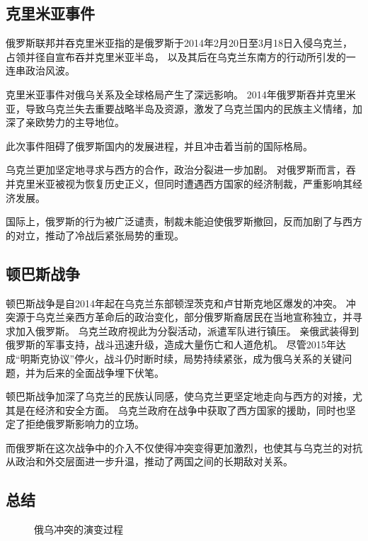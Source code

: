 \subsection{克里米亚事件}
俄罗斯联邦并吞克里米亚指的是俄罗斯于2014年2月20日至3月18日入侵乌克兰，
占领并径自宣布吞并克里米亚半岛，
以及其后在乌克兰东南方的行动所引发的一连串政治风波。\cite{noauthor__2024}

克里米亚事件对俄乌关系及全球格局产生了深远影响。
2014年俄罗斯吞并克里米亚，导致乌克兰失去重要战略半岛及资源，激发了乌克兰国内的民族主义情绪，加深了亲欧势力的主导地位。

此次事件阻碍了俄罗斯国内的发展进程，并且冲击着当前的国际格局。\cite{__2023-2}

乌克兰更加坚定地寻求与西方的合作，政治分裂进一步加剧。
对俄罗斯而言，吞并克里米亚被视为恢复历史正义，但同时遭遇西方国家的经济制裁，严重影响其经济发展。

国际上，俄罗斯的行为被广泛谴责，制裁未能迫使俄罗斯撤回，反而加剧了与西方的对立，推动了冷战后紧张局势的重现。
\subsection{顿巴斯战争}
顿巴斯战争是自2014年起在乌克兰东部顿涅茨克和卢甘斯克地区爆发的冲突。
冲突源于乌克兰亲西方革命后的政治变化，部分俄罗斯裔居民在当地宣称独立，并寻求加入俄罗斯。
乌克兰政府视此为分裂活动，派遣军队进行镇压。
亲俄武装得到俄罗斯的军事支持，战斗迅速升级，造成大量伤亡和人道危机。
尽管2015年达成“明斯克协议”停火，战斗仍时断时续，局势持续紧张，成为俄乌关系的关键问题，并为后来的全面战争埋下伏笔。

顿巴斯战争加深了乌克兰的民族认同感，使乌克兰更坚定地走向与西方的对接，尤其是在经济和安全方面。
乌克兰政府在战争中获取了西方国家的援助，同时也坚定了拒绝俄罗斯影响力的立场。

而俄罗斯在这次战争中的介入不仅使得冲突变得更加激烈，也使其与乌克兰的对抗从政治和外交层面进一步升温，推动了两国之间的长期敌对关系。

\subsection{总结}
\begin{figure}[htbp]
    \centering
    \caption{俄乌冲突的演变过程}
\end{figure}